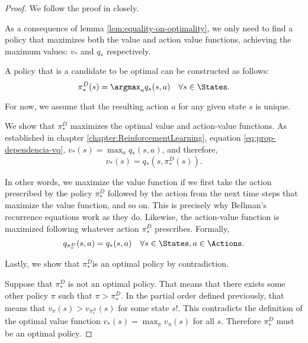 \begin{proof}
    We follow the proof in \cite[Pg.~115]{raoRL4F} closely.

    As a consequence of lemma \ref{lem:equality-on-optimality}, we only need to
    find a policy that maximizes both the value and action value functions,
    achieving the maximum values: $v_*$ and $q_*$ respectively.

    A policy that is a candidate to be optimal can be constructed as follows:
    \begin{equation*}
        \pi_{*}^{D} (s) = \argmax_{a} q_{*} (s, a) \quad \forall s \in \States.
    \end{equation*}

    For now, we assume that the resulting action $a$ for any given state $s$ is
    unique.

    We show that $\pi_{*}^{D}$ maximizes the optimal value and action-value
    functions. As established in chapter \ref{chapter:ReinforcementLearning},
    equation \eqref{eq:prop-dependencia-vq}, $v_* (s) = \max_a q_* (s, a)$, and
    therefore,
    \begin{equation*}
        v_* (s) = q_* (s, \pi_{*}^{D}(s)).
    \end{equation*}

    In other words, we maximize the value function if we first take the action
    prescribed by the policy $\pi_{*}^{D}$ followed by the action from the next
    time steps that maximize the value function, and so on. This is precisely
    why Bellman's recurrence equations work as they do. Likewise, the
    action-value function is maximized following whatever action $\pi_{*}^{D}$
    prescribes. Formally,
    \begin{equation*}
        q_{\pi_{*}^{D}} (s, a) = q_* (s,a) \quad \forall s \in \States, a \in \Actions.
    \end{equation*}

    Lastly, we show that $\pi_{*}^{D}$is an optimal policy by contradiction.

    Suppose that $\pi_{*}^{D}$ is not an optimal policy. That means that there
    exists some other policy $\pi$ such that $\pi > \pi_{*}^{D}$. In the partial
    order defined previously, that means that $v_{\pi} (s) > v_{\pi_{*}^{D}}
    (s)$ for some state $s$!. This contradicts the definition of the
    optimal value function $v_* (s) = \max_\pi v_\pi (s)$ for all $s$. Therefore
    $\pi_{*}^{D}$ must be an optimal policy.
\end{proof}

